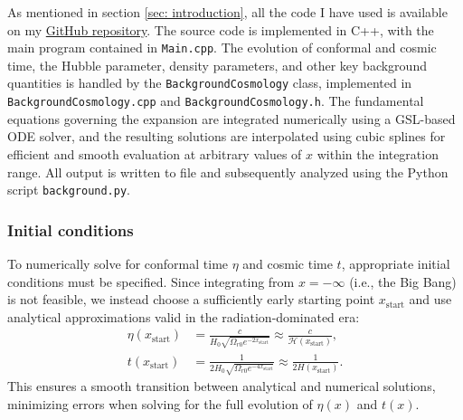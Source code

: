 \documentclass{aa}
\numberwithin{equation}{section}
\numberwithin{table}{section}
\numberwithin{figure}{section}
\begin{document}

As mentioned in section \ref{sec: introduction}, all the code I have used is available on my \href{https://github.com/paljettrosa/AST5220}{GitHub repository}. The source code is implemented in C++, with the main program contained in \verb|Main.cpp|. The evolution of conformal and cosmic time, the Hubble parameter, density parameters, and other key background quantities is handled by the \verb|BackgroundCosmology| class, implemented in \verb|BackgroundCosmology.cpp| and \verb|BackgroundCosmology.h|. The fundamental equations governing the expansion are integrated numerically using a GSL-based ODE solver, and the resulting solutions are interpolated using cubic splines for efficient and smooth evaluation at arbitrary values of $x$ within the integration range. All output is written to file and subsequently analyzed using the Python script \verb|background.py|.



\subsubsection{Initial conditions}\label{subsubsec: I method initial}
To numerically solve for conformal time $\eta$ and cosmic time $t$, appropriate initial conditions must be specified. Since integrating from $x = -\infty$ (i.e., the Big Bang) is not feasible, we instead choose a sufficiently early starting point $x_{\text{start}}$ and use analytical approximations valid in the radiation-dominated era:
\begin{align}
  \eta(x_{\text{start}}) &= \frac{c}{H_0\sqrt{\Omega_{r0}e^{-2x_\text{start}}}} \approx \frac{c}{\mathcal{H}(x_{\text{start}})},
  \\
  t(x_{\text{start}}) &= \frac{1}{2H_0\sqrt{\Omega_{r0}e^{-4x_\text{start}}}} \approx \frac{1}{2H(x_{\text{start}})}.
\end{align}
This ensures a smooth transition between analytical and numerical solutions, minimizing errors when solving for the full evolution of $\eta(x)$ and $t(x)$.
\end{document}
